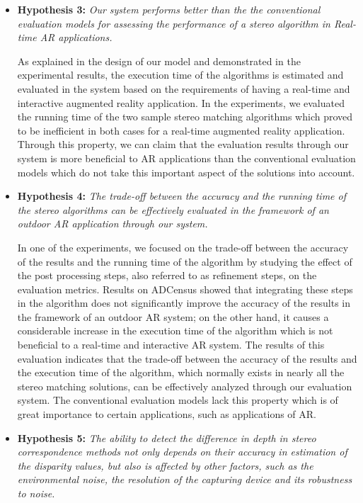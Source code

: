 \begin{itemize}
\item \textbf{Hypothesis 3:} \emph{Our system performs better than the the conventional evaluation models for assessing the performance of a stereo algorithm in
Real-time AR applications.}

As explained in the design of our model and demonstrated in the experimental results, the execution time of the algorithms 
is estimated and evaluated in the system based on the requirements of having a real-time and interactive augmented reality application.
In the experiments, we evaluated the running time of the two sample stereo matching algorithms which proved to be inefficient in both cases for 
a real-time augmented reality application. Through this property, we can claim that the evaluation results through our system is more beneficial to AR applications
than the conventional evaluation models which do not take this important aspect of the solutions into account.

\item \textbf{Hypothesis 4:} \emph{The trade-off between the accuracy and the running time of the stereo algorithms can be effectively evaluated 
in the framework of an outdoor AR application through our system.} 

In one of the experiments, we focused on the trade-off between the accuracy of the results and the running time of the algorithm by studying the effect
of the post processing steps, also referred to as refinement steps, on the evaluation metrics. Results on ADCensus showed that integrating these steps in the algorithm
does not significantly improve the accuracy of the results in the framework of an outdoor AR system; on the other hand, it causes a considerable increase in the execution
time of the algorithm which is not beneficial to a real-time and interactive AR system. The results of this evaluation indicates that the trade-off between the accuracy 
of the results and the execution time of the algorithm, which normally exists in nearly all the stereo matching solutions, can be effectively analyzed 
through our evaluation system. The conventional evaluation models lack this property which is of great importance to certain applications, such as applications of AR.

\item \textbf{Hypothesis 5:} \emph{The ability to detect the difference in depth in stereo correspondence methods not only depends on their accuracy
in estimation of the disparity values, but also is affected by other factors, such as the environmental noise, the resolution of the capturing device and its
robustness to noise.}


\end{itemize}
